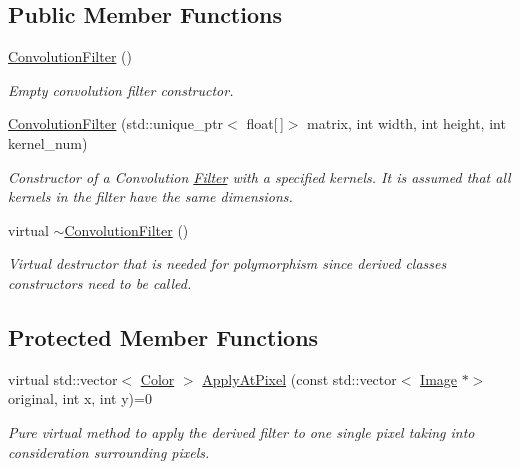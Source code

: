 \subsection*{Public Member Functions}
\begin{DoxyCompactItemize}
\item 
\mbox{\label{classConvolutionFilter_a7a92bc98d0d607a0be58874db37c3e1b}} 
\hyperlink{classConvolutionFilter_a7a92bc98d0d607a0be58874db37c3e1b}{Convolution\+Filter} ()
\begin{DoxyCompactList}\small\item\em Empty convolution filter constructor. \end{DoxyCompactList}\item 
\hyperlink{classConvolutionFilter_af9356cfa9f768fbf7c97b51e7867ce12}{Convolution\+Filter} (std\+::unique\+\_\+ptr$<$ float\mbox{[}$\,$\mbox{]}$>$ matrix, int width, int height, int kernel\+\_\+num)
\begin{DoxyCompactList}\small\item\em Constructor of a Convolution \hyperlink{classFilter}{Filter} with a specified kernels. It is assumed that all kernels in the filter have the same dimensions. \end{DoxyCompactList}\item 
\mbox{\label{classConvolutionFilter_a8d14d7b0f063528641be7fca0f1cd9dc}} 
virtual \hyperlink{classConvolutionFilter_a8d14d7b0f063528641be7fca0f1cd9dc}{$\sim$\+Convolution\+Filter} ()
\begin{DoxyCompactList}\small\item\em Virtual destructor that is needed for polymorphism since derived classes constructors need to be called. \end{DoxyCompactList}\end{DoxyCompactItemize}
\subsection*{Protected Member Functions}
\begin{DoxyCompactItemize}
\item 
virtual std\+::vector$<$ \hyperlink{classColor}{Color} $>$ \hyperlink{classConvolutionFilter_abc4b4ffef2b69fc2b7164e96af6cf186}{Apply\+At\+Pixel} (const std\+::vector$<$ \hyperlink{classImage}{Image} $\ast$$>$ original, int x, int y)=0
\begin{DoxyCompactList}\small\item\em Pure virtual method to apply the derived filter to one single pixel taking into consideration surrounding pixels. \end{DoxyCompactList}\end{DoxyCompactItemize}
